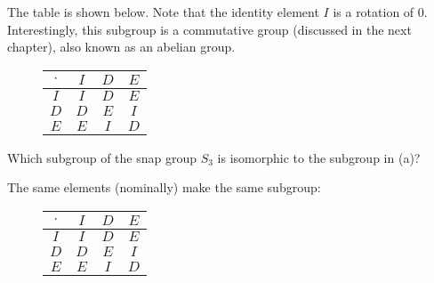 \documentclass[../key.tex]{subfiles}
\begin{document}
\noindent The table is shown below. Note that the identity element $I$ is a rotation of $0$. Interestingly, this subgroup is a commutative group (discussed in the next chapter), also known as an abelian group.

\begin{figure}[h]
	\begin{center}
		\begin{minipage}[b]{\textwidth}
			\centering
			\begin{tabular}{c|ccc}
				\hline
				$\cdot$ & $I$ & $D$ & $E$ \\ \hline
				\rowcolor{light-gray}
				$I$ & $I$ & $D$ & $E$ \\
				$D$ & $D$ & $E$ & $I$ \\
				\rowcolor{light-gray}
				$E$ & $E$ & $I$ & $D$ \\ \hline
			\end{tabular}
			\vspace*{0.5\baselineskip}
		\end{minipage}
	\end{center}
	\vspace*{-2\baselineskip}
\end{figure}

\begin{inner_problem}
\item Which subgroup of the snap group $S_3$ is isomorphic to the subgroup in (a)?
\end{inner_problem}

\noindent The same elements (nominally) make the same subgroup:

\begin{figure}[h]
	\begin{center}
		\begin{minipage}[b]{\textwidth}
			\centering
			\begin{tabular}{c|ccc}
				\hline
				$\cdot$ & $I$ & $D$ & $E$ \\ \hline
				\rowcolor{light-gray}
				$I$ & $I$ & $D$ & $E$ \\
				$D$ & $D$ & $E$ & $I$ \\
				\rowcolor{light-gray}
				$E$ & $E$ & $I$ & $D$ \\ \hline
			\end{tabular}
			\vspace*{0.5\baselineskip}
		\end{minipage}
	\end{center}
	\vspace*{-2\baselineskip}
\end{figure}
\end{document}
